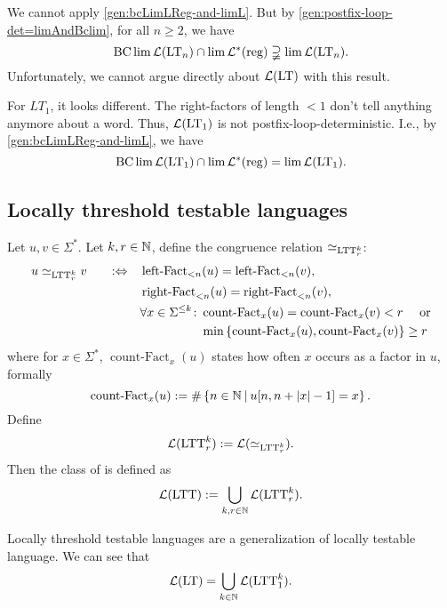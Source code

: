 We cannot apply \cref{gen:bcLimLReg-and-limL}.  But by \cref{gen:postfix-loop-det=limAndBclim}, for all $n \ge 2$, we have
\[ \operatorname{BC} \lim \mathcal{L}(\textup{\textrm{LT}}_n) \cap \lim \mathcal{L}^*(\textup{\textrm{reg}}) \supsetneqq \lim \mathcal{L}(\textup{\textrm{LT}}_n) . \]
Unfortunately, we cannot argue directly about $\mathcal{L}(\textup{\textrm{LT}})$ with this result.

For $LT_1$, it looks different. The right-factors of length $<1$ don't tell anything anymore about a word. Thus, $\mathcal{L}(\textup{\textrm{LT}}_1)$ is not postfix-loop-deterministic. I.e., by \cref{gen:bcLimLReg-and-limL}, we have
\[ \operatorname{BC} \lim \mathcal{L}(\textup{\textrm{LT}}_1) \cap \lim \mathcal{L}^*(\textup{\textrm{reg}}) = \lim \mathcal{L}(\textup{\textrm{LT}}_1) . \]



\subsection{Locally threshold testable languages}
\label{lang:LTT}
Let $u,v \in \Sigma^*$. Let $k,r \in \mathbb{N}$, define the congruence relation $\simeq_{\textup{\textrm{LTT}}^k_r}$:
\begin{alignat*}{3}
u \simeq_{\LTT^k_r} v \ \ \ && :\Leftrightarrow \ \ \ & \operatorname{left-Fact}_{<n}(u) = \operatorname{left-Fact}_{<n}(v) , \\
&&& \operatorname{right-Fact}_{<n}(u) = \operatorname{right-Fact}_{<n}(v) , \\
&&& \begin{aligned}
\forall x \in \Sigma^{\le k} \colon & \operatorname{count-Fact}_x(u) = \operatorname{count-Fact}_x(v) < r \ \ \ \ \text{or} \\
& \min \Set{\operatorname{count-Fact}_x(u), \operatorname{count-Fact}_x(v)} \ge r
\end{aligned}
\end{alignat*}
where for $x \in \Sigma^*$, $\operatorname{count-Fact}_x(u)$ states how often $x$ occurs as a factor in $u$, formally
\[ \operatorname{count-Fact}_x(u) := \#\Set{n \in \N}{u[n,n+\vert x \vert - 1] = x} . \]
Define
\[ \mathcal{L}(\textup{\textrm{LTT}}^k_r) := \mathcal{L}(\simeq_{\textup{\textrm{LTT}}^k_r}). \]
Then the class of  is defined as
\[ \mathcal{L}(\textup{\textrm{LTT}}) := \bigcup_{k,r\in\mathbb{N}} \mathcal{L}(\textup{\textrm{LTT}}^k_r) . \]

Locally threshold testable languages are a generalization of locally testable language. We can see that
\[  \mathcal{L}(\textup{\textrm{LT}}) = \bigcup_{k\in\mathbb{N}} \mathcal{L}(\textup{\textrm{LTT}}^k_1) . \]

